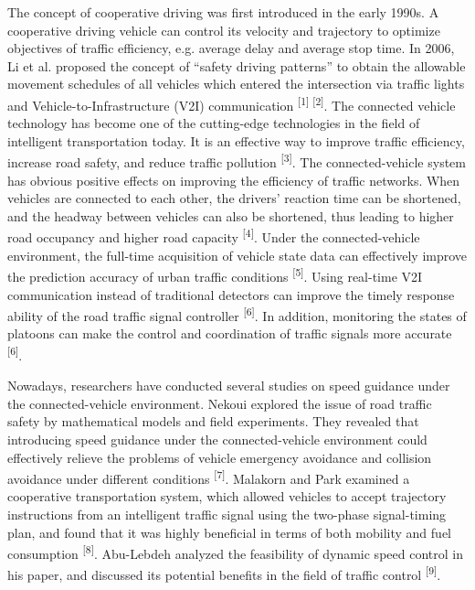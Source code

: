 The concept of cooperative driving was first introduced in the early
1990s. A cooperative driving vehicle can control its velocity and
trajectory to optimize objectives of traffic efficiency, e.g. average
delay and average stop time. In 2006, Li et al. proposed the concept of
``safety driving patterns'' to obtain the allowable movement schedules
of all vehicles which entered the intersection via traffic lights and
Vehicle-to-Infrastructure (V2I) communication \textsuperscript{{[}1{]}
{[}2{]}}. The connected vehicle technology has become one of the
cutting-edge technologies in the field of intelligent transportation
today. It is an effective way to improve traffic efficiency, increase
road safety, and reduce traffic pollution \textsuperscript{{[}3{]}}. The
connected-vehicle system has obvious positive effects on improving the
efficiency of traffic networks. When vehicles are connected to each
other, the drivers' reaction time can be shortened, and the headway
between vehicles can also be shortened, thus leading to higher road
occupancy and higher road capacity \textsuperscript{{[}4{]}}. Under the
connected-vehicle environment, the full-time acquisition of vehicle
state data can effectively improve the prediction accuracy of urban
traffic conditions \textsuperscript{{[}5{]}}. Using real-time V2I
communication instead of traditional detectors can improve the timely
response ability of the road traffic signal controller
\textsuperscript{{[}6{]}}. In addition, monitoring the states of
platoons can make the control and coordination of traffic signals more
accurate \textsuperscript{{[}6{]}}.

Nowadays, researchers have conducted several studies on speed guidance
under the connected-vehicle environment. Nekoui explored the issue of
road traffic safety by mathematical models and field experiments. They
revealed that introducing speed guidance under the connected-vehicle
environment could effectively relieve the problems of vehicle emergency
avoidance and collision avoidance under different conditions
\textsuperscript{{[}7{]}}. Malakorn and Park examined a cooperative
transportation system, which allowed vehicles to accept trajectory
instructions from an intelligent traffic signal using the two-phase
signal-timing plan, and found that it was highly beneficial in terms of
both mobility and fuel consumption \textsuperscript{{[}8{]}}. Abu-Lebdeh
analyzed the feasibility of dynamic speed control in his paper, and
discussed its potential benefits in the field of traffic control
\textsuperscript{{[}9{]}}.

